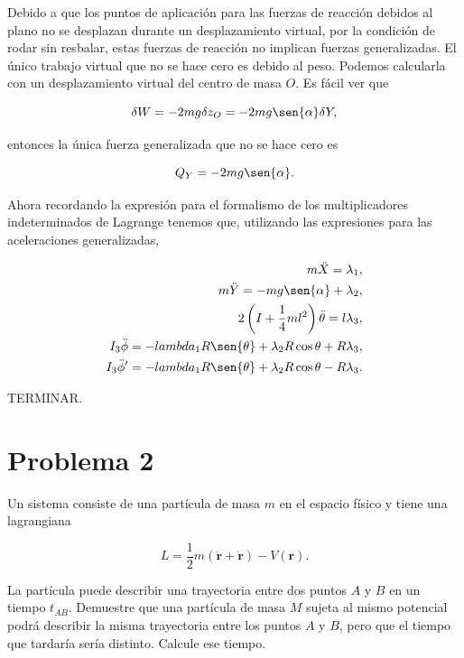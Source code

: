 \documentclass[a4paper,10pt]{article}
\numberwithin{equation}{section}
\begin{document}
Debido a que los puntos de aplicación para las fuerzas de reacción 
debidos al plano no se desplazan durante un desplazamiento virtual, 
por la condición de rodar sin resbalar, estas fuerzas de reacción no 
implican fuerzas generalizadas. El único trabajo virtual que no 
se hace cero es debido al peso. Podemos calcularla con un desplazamiento 
virtual del centro de masa $O$. Es fácil ver que 

\begin{equation}
 \delta W = - 2mg \delta z_O = -2mg\sen{\alpha}\delta Y,
\end{equation}

entonces la única fuerza generalizada que no se hace cero es 

\begin{equation}
 Q_Y = -2mg\sen{\alpha}.
\end{equation}

Ahora recordando la expresión para el formalismo de los multiplicadores 
indeterminados de Lagrange tenemos que, utilizando las expresiones 
para las aceleraciones generalizadas,

\begin{align}
 m\ddot{X} = \lambda_1, \\
 m\ddot{Y} = - mg\sen{\alpha} + \lambda_2, \\
 2\left( I + \frac{1}{4}ml^2\right) \ddot{\theta} = l\lambda_3, \\
 I_3\ddot{\phi} = -lambda_1 R\sen{\theta} + \lambda_2 R\cos{\theta} + R\lambda_3, \\
 I_3\ddot{\phi}' = -lambda_1 R\sen{\theta} + \lambda_2 R\cos{\theta} - R\lambda_3.
\end{align}


TERMINAR.


\section{Problema 2}

Un sistema consiste de una partícula de masa $m$ en el espacio físico y tiene una 
lagrangiana

$$
L = \frac{1}{2}m(\mathbf{\dot{r}} + \mathbf{\dot{r}}) - V(\mathbf{r}).
$$

La partícula puede describir una trayectoria entre dos puntos $A$ y $B$ en un tiempo 
$t_{AB}$. Demuestre que una partícula de masa $M$ sujeta al mismo potencial podrá 
describir la misma trayectoria entre los puntos $A$ y $B$, pero que el tiempo que 
tardaría sería distinto. Calcule ese tiempo.
\end{document}

